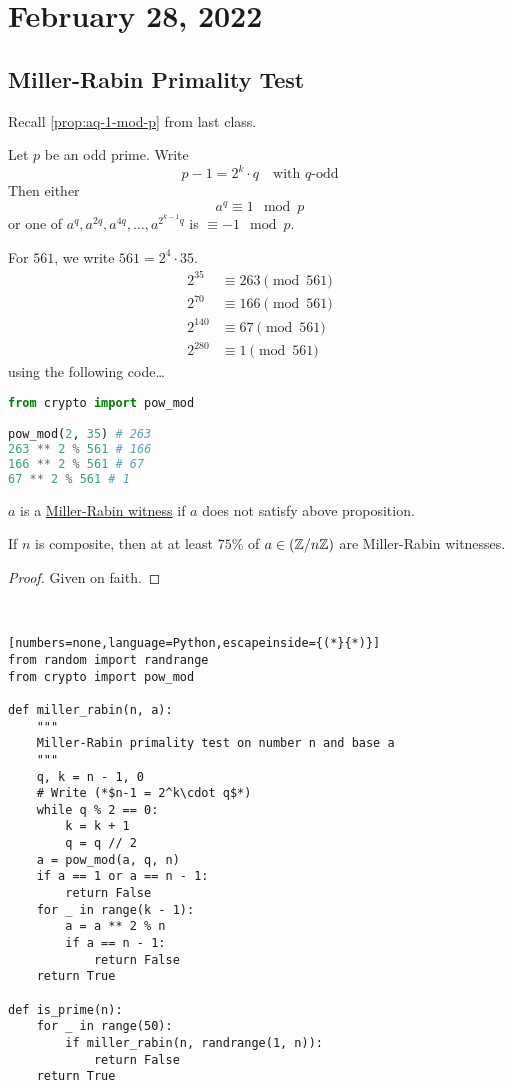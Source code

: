 \section{February 28, 2022}
\subsection{Miller-Rabin Primality Test}
Recall \cref{prop:aq-1-mod-p} from last class.
\begin{proposition*}
    Let $p$ be an odd prime. Write
    \[p-1 = 2^k\cdot q\quad\text{with $q$-odd}\]
    Then either
    \[a^{q}\equiv 1\mod p\]
    or one of $a^q, a^{2q}, a^{4q},\dots, a^{2^{k-1}q}$ is $\equiv -1\mod p$.
\end{proposition*}

For $561$, we write $561 = 2^4\cdot 35$.
\begin{align*}
    2^{35}  & \equiv 263 \pmod{561} \\
    2^{70}  & \equiv 166 \pmod{561} \\
    2^{140} & \equiv 67 \pmod{561}  \\
    2^{280} & \equiv 1 \pmod{561}
\end{align*}
using the following code\dots
\begin{lstlisting}[language=Python]
from crypto import pow_mod

pow_mod(2, 35) # 263
263 ** 2 % 561 # 166
166 ** 2 % 561 # 67
67 ** 2 % 561 # 1
\end{lstlisting}

\begin{definition}
    $a$ is a \ul{Miller-Rabin witness} if $a$ does not satisfy above proposition.
\end{definition}

\begin{theorem}
    If $n$ is composite, then at at least $75\%$ of $a\in(\mathbb Z/n\mathbb Z)$ are Miller-Rabin witnesses.
\end{theorem}
\begin{proof}
    Given on faith.
\end{proof}

\begin{algorithm}
    ~\begin{lstlisting}[numbers=none,language=Python,escapeinside={(*}{*)}]
from random import randrange
from crypto import pow_mod

def miller_rabin(n, a):
    """
    Miller-Rabin primality test on number n and base a
    """
    q, k = n - 1, 0
    # Write (*$n-1 = 2^k\cdot q$*)
    while q % 2 == 0:
        k = k + 1
        q = q // 2
    a = pow_mod(a, q, n)
    if a == 1 or a == n - 1:
        return False
    for _ in range(k - 1):
        a = a ** 2 % n
        if a == n - 1:
            return False
    return True

def is_prime(n):
    for _ in range(50):
        if miller_rabin(n, randrange(1, n)):
            return False
    return True
\end{lstlisting}
\end{algorithm}

